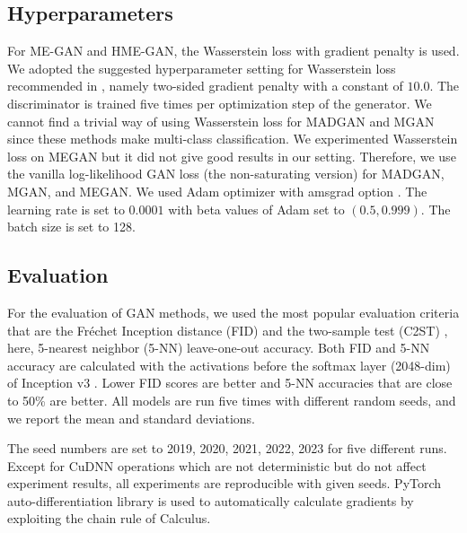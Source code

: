\documentclass[a4paper,onesided,12pt]{report}
\begin{document}
\subsection{Hyperparameters}
\label{subsec:hyperparameter}
For ME-GAN and HME-GAN, the Wasserstein loss \cite{arjovsky2017wasserstein} with gradient penalty \cite{gulrajani2017improved} is used. We adopted the suggested hyperparameter setting for Wasserstein loss recommended in \cite{gulrajani2017improved}, namely two-sided gradient penalty with a constant of $10.0$. The discriminator is trained five times per optimization step of the generator. We cannot find a trivial way of using Wasserstein loss for MADGAN and MGAN since these methods make multi-class classification. We experimented Wasserstein loss on MEGAN but it did not give good results in our setting. Therefore, we use the vanilla log-likelihood GAN loss (the non-saturating version) for MADGAN, MGAN, and MEGAN. We used Adam optimizer \cite{kingma2014adam} with amsgrad option \cite{reddi2019convergence}. The learning rate is set to $0.0001$ with beta values of Adam set to $(0.5, 0.999)$. The batch size is set to 128.

\subsection{Evaluation}
\label{subsec:eval}
For the evaluation of GAN methods, we used the most popular evaluation criteria that are the Fr\'echet Inception distance (FID) \cite{heusel2017gans} and the two-sample test (C2ST) \cite{lopez2016revisiting}, here, 5-nearest neighbor (5-NN) leave-one-out accuracy. Both FID and 5-NN accuracy are calculated with the activations before the softmax layer (2048-dim) of Inception v3 \cite{szegedy2016rethinking}. Lower FID scores are better and 5-NN accuracies that are close to 50\% are better. All models are run five times with different random seeds, and we report the mean and standard deviations.

The seed numbers are set to {2019, 2020, 2021, 2022, 2023} for five different runs. Except for CuDNN \cite{chetlur2014cudnn} operations which are not deterministic but do not affect experiment results, all experiments are reproducible with given seeds. PyTorch auto-differentiation library \cite{paszke2017automatic} is used to automatically calculate gradients by exploiting the chain rule of Calculus.
\end{document}

